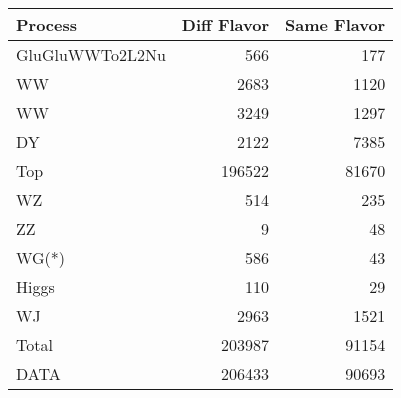 \begin{table}[ht]
	\centering
\begin{tabular}{lrr}

         Process &  Diff Flavor &  Same Flavor \\
		\hline
 GluGluWWTo2L2Nu &          566 &          177 \\
              WW &         2683 &         1120 \\
              WW &         3249 &         1297 \\
              DY &         2122 &         7385 \\
             Top &       196522 &        81670 \\
              WZ &          514 &          235 \\
              ZZ &            9 &           48 \\
           WG(*) &          586 &           43 \\
           Higgs &          110 &           29 \\
              WJ &         2963 &         1521 \\
\hline
           Total &       203987 &        91154 \\
            DATA &       206433 &        90693 \\


\end{tabular}

\end{table}